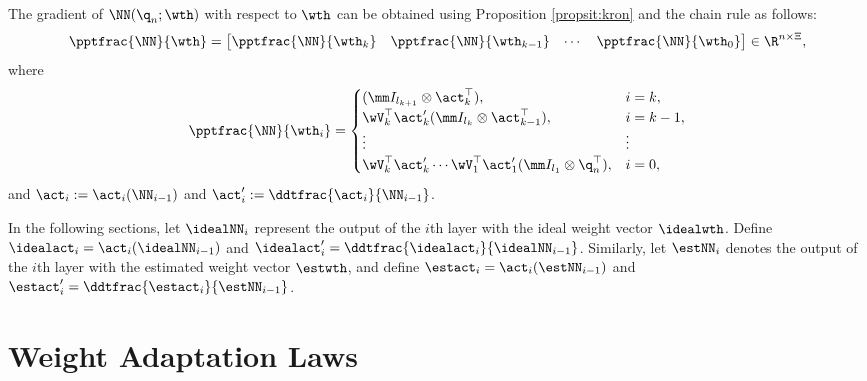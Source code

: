 \documentclass[letterpaper, journal]{IEEEtran}
\begin{document}
The gradient of $ \NN({\q}_n;\wth)$ with respect to $\wth$ can be obtained using Proposition \ref{propsit:kron} and the chain rule as follows:
\begin{equation}
    \pptfrac{\NN}{\wth}=
    \begin{bmatrix}
        \pptfrac{\NN}{\wth_k}&
        \pptfrac{\NN}{\wth_{k-1}}&
    \cdots &
        \pptfrac{\NN}{\wth_0}
    \end{bmatrix}
    \in\R^{n \times \Xi}
    ,
    \label{eq:gradient:phi}
\end{equation}
where
\begin{equation}
    \pptfrac{\NN}{\wth_i} = 
    \begin{cases}
        (
            \mm I_{l_{k+1}}
            \otimes 
            \act_{k}^\top  
        )
        , 
        &
        i=k
        ,
        \\
        \wV_k^\top\act_{k}' 
        (
            \mm I_{l_{k}}
            \otimes  
            \act_{k-1}^\top  
        )
        , 
        & 
        i=k-1
        ,
        \\
        \vdots 
        &
        \vdots 
        \\
        \wV_k^\top\act'_{k} 
        \cdots 
        \wV_1^\top\act_1' 
        (
            \mm I_{l_1}
            \otimes 
            {\q}_n^\top  
        )
        , 
        &
        i = 0
        ,
    \end{cases}
    \label{eq:NN:grad}
\end{equation}
and $\act_i:= \act_i(\NN_{i-1})$ and $\act_i':= \ddtfrac{\act_i}{\NN_{i-1}}$.

In the following sections, let $\idealNN_i$ represent the output of the $i$th layer with the ideal weight vector $\idealwth$. 
Define $\idealact_i=\act_i(\idealNN_{i-1})$ and ${\idealact}'_i= \ddtfrac{\idealact_i}{\idealNN_{i-1}}$. 
Similarly, let $\estNN_i$ denotes the output of the $i$th layer with the estimated weight vector $\estwth$, and define $\estact_i=\act_i(\estNN_{i-1})$ and $\estact_i'= \ddtfrac{\estact_i}{\estNN_{i-1}}$.

\section{Weight Adaptation Laws}\label{sec:adap_laws}

\end{document}
